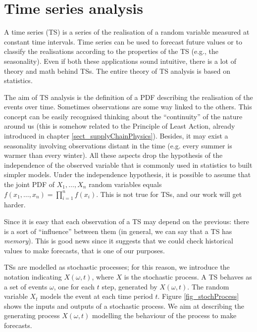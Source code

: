 \section{Time series analysis} \label{secTimeSeries}


A time series (TS) is a series of the realisation of a random variable measured at constant time intervals. Time series can be used to forecast future values or to classify the realisations according to the properties of the TS (e.g., the seasonality). Even if both these applications sound intuitive, there is a lot of theory and math behind TSs. The entire theory of TS analysis is based on statistics.\par

The aim of TS analysis is the definition of a PDF describing the realisation of the events over time. Sometimes observations are some way linked to the others. This concept can be easily recognised thinking about the “continuity” of the nature around us (this is somehow related to the Principle of Least Action, already introduced in chapter \ref{sect_supplyChainPhysics}). Besides, it may exist a seasonality involving observations distant in the time (e.g. every summer is warmer than every winter). All these aspects drop the hypothesis of the independence of the observed variable that is commonly used in statistics to built simpler models. Under the independence hypothesis, it is possible to assume that the joint PDF of $X_1,\ldots,X_n$ random variables equals $f(x_1,\ldots,x_n)=\prod_{i=1}^{n}{f(x_i)}$. This is not true for TSs, and our work will get harder.\par

Since it is easy that each observation of a TS may depend on the previous: there is a sort of “influence” between them (in general, we can say that a TS has \textit{memory}). This is good news since it suggests that we could check historical values to make forecasts, that is one of our purposes.\par

TSs are modelled as stochastic processes; for this reason, we introduce the notation indicating $X(\omega,t)$, where $X$ is the stochastic process. A TS behaves as a set of events $\omega$, one for each $t$ step, generated by $X(\omega,t)$. The random variable $X_t$ models the event at each time period $t$. Figure \ref{fig_stochProcess} shows the inputs and outputs of a stochastic process. We aim at describing the generating process $X(\omega,t)$ modelling the behaviour of the process to make forecasts.

